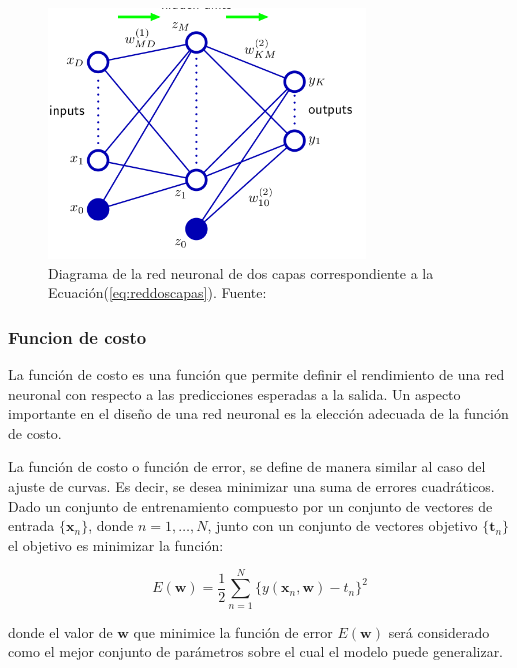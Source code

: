         \begin{figure}[!h] 
            \centering
            \includegraphics[width=0.75\textwidth]{img/reddoscapas}
            \caption[Diagrama de una red neuronal de dos capas]{Diagrama de la red neuronal de dos capas correspondiente a la Ecuación(\ref{eq:reddoscapas}). Fuente: \cite{Bishop2006} }
            \label{fig:reddoscapas}
        \end{figure}
        
        \subsubsection{Funcion de costo}
        La función de costo es una función que permite definir el rendimiento de una red neuronal con respecto a las 
        predicciones esperadas a la salida. Un aspecto importante en el diseño de una red neuronal es la elección adecuada 
        de la función de costo. 

        La función de costo o función de error, se define de manera similar al caso del ajuste de curvas. Es decir, se desea 
        minimizar una suma de errores cuadráticos. Dado un conjunto de entrenamiento compuesto por un conjunto de vectores 
        de entrada $\{\mathbf{x}_n \}$, donde $n = 1, \ldots , N$, junto con un conjunto de vectores objetivo $\{\mathbf{t}_n \}$
        el objetivo es minimizar la función:

        \begin{equation}\label{eq:error}
            E(\mathbf{w}) = \frac{1}{2} \sum_{n=1}^N \{y(\mathbf{x}_n, \mathbf{w}) - t_n\}^2
        \end{equation}

        donde el valor de $\mathbf{w}$ que minimice la función de error $E(\mathbf{w})$ será considerado como el mejor conjunto 
        de parámetros sobre el cual el modelo puede generalizar.

